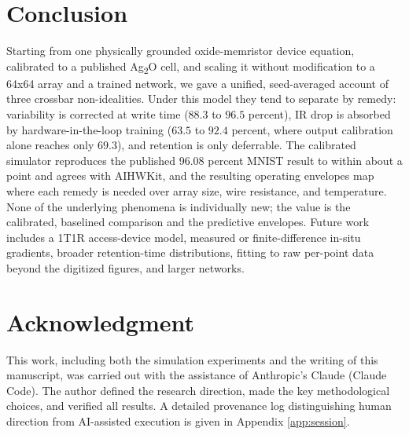 \documentclass[conference]{IEEEtran}
\begin{document}
\section{Conclusion}
Starting from one physically grounded oxide-memristor device equation, calibrated
to a published Ag\textsubscript{2}O cell, and scaling it without modification to a
64x64 array and a trained network, we gave a unified, seed-averaged account of
three crossbar non-idealities. Under this model they tend to separate by remedy:
variability is corrected at write time ($88.3$ to $96.5$ percent), IR drop is
absorbed by hardware-in-the-loop training ($63.5$ to $92.4$ percent, where output
calibration alone reaches only $69.3$), and retention is only deferrable. The
calibrated simulator reproduces the published 96.08 percent MNIST result to within
about a point and agrees with AIHWKit, and the resulting operating envelopes map
where each remedy is needed over array size, wire resistance, and temperature.
None of the underlying phenomena is individually new; the value is the calibrated,
baselined comparison and the predictive envelopes. Future work includes a 1T1R
access-device model, measured or finite-difference in-situ gradients, broader
retention-time distributions, fitting to raw per-point data beyond the digitized
figures, and larger networks.

\section*{Acknowledgment}
This work, including both the simulation experiments and the writing of this
manuscript, was carried out with the assistance of Anthropic's Claude (Claude
Code). The author defined the research direction, made the key methodological
choices, and verified all results. A detailed provenance log distinguishing human
direction from AI-assisted execution is given in Appendix \ref{app:session}.
\end{document}
